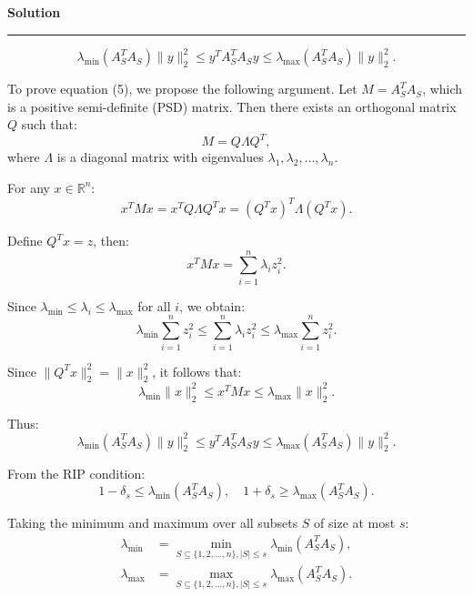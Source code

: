 \documentclass[a4paper,12pt]{article}
\newenvironment{solution}[2][]{%
    \begin{mdframed}[linecolor=blue!70!black, linewidth=2pt, roundcorner=10pt, backgroundcolor=yellow!10!white, skipabove=12pt, skipbelow=12pt]%
        \textbf{\large #2}
        \par\noindent\rule{\textwidth}{0.4pt}
}{
    \end{mdframed}
}
\begin{document}
\begin{solution}{Solution}
\begin{equation}
    \lambda_{\min}(A_S^T A_S) \|y\|_2^2 \leq y^T A_S^T A_S y \leq \lambda_{\max}(A_S^T A_S) \|y\|_2^2.
\end{equation}
  
To prove equation (5), we propose the following argument. Let $M = A_S^T A_S$, which is a positive semi-definite (PSD) matrix. Then there exists an orthogonal matrix $Q$ such that:
\begin{equation}
    M = Q \Lambda Q^T,
\end{equation}
where $\Lambda$ is a diagonal matrix with eigenvalues $\lambda_1, \lambda_2, \dots, \lambda_n$.
  
For any $x \in \mathbb{R}^n$:
\begin{equation}
    x^T M x = x^T Q \Lambda Q^T x = (Q^T x)^T \Lambda (Q^T x).
\end{equation}
  
Define $Q^T x = z$, then:
\begin{equation}
    x^T M x = \sum_{i=1}^{n} \lambda_i z_i^2.
\end{equation}
  
Since $\lambda_{\min} \leq \lambda_i \leq \lambda_{\max}$ for all $i$, we obtain:
\begin{equation}
    \lambda_{\min} \sum_{i=1}^{n} z_i^2 \leq \sum_{i=1}^{n} \lambda_i z_i^2 \leq \lambda_{\max} \sum_{i=1}^{n} z_i^2.
\end{equation}
  
Since $\|Q^T x\|_2^2 = \|x\|_2^2$, it follows that:
\begin{equation}
    \lambda_{\min} \|x\|_2^2 \leq x^T M x \leq \lambda_{\max} \|x\|_2^2.
\end{equation}
  
Thus:
\begin{equation}
    \lambda_{\min}(A_S^T A_S) \|y\|_2^2 \leq y^T A_S^T A_S y \leq \lambda_{\max}(A_S^T A_S) \|y\|_2^2.
\end{equation}
  
From the RIP condition:
\begin{equation}
    1 - \delta_s \leq \lambda_{\min}(A_S^T A_S), \quad 1 + \delta_s \geq \lambda_{\max}(A_S^T A_S).
\end{equation}
  
Taking the minimum and maximum over all subsets $S$ of size at most $s$:
\begin{align*}
    \lambda_{\min} &= \min_{S \subseteq \{1,2,\dots,n\}, |S| \leq s} \lambda_{\min}(A_S^T A_S),\\
    \lambda_{\max} &= \max_{S \subseteq \{1,2,\dots,n\}, |S| \leq s} \lambda_{\max}(A_S^T A_S).
\end{align*}
  

\end{solution}
\end{document}
